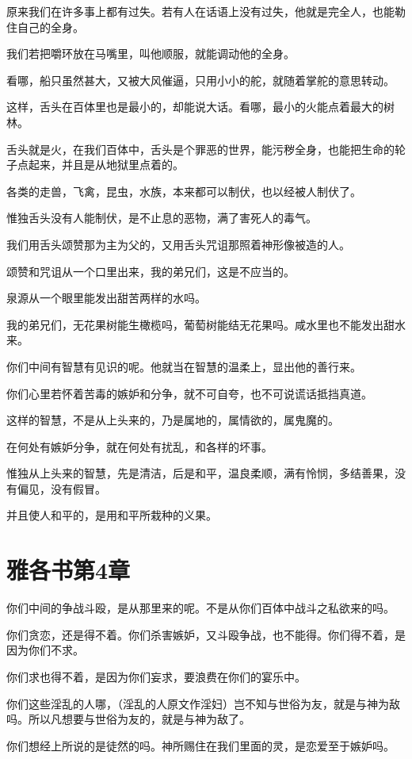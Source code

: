 \documentclass[12pt,oneside]{book}
\begin{document}
原来我们在许多事上都有过失。若有人在话语上没有过失，他就是完全人，也能勒住自己的全身。

我们若把嚼环放在马嘴里，叫他顺服，就能调动他的全身。

看哪，船只虽然甚大，又被大风催逼，只用小小的舵，就随着掌舵的意思转动。

这样，舌头在百体里也是最小的，却能说大话。看哪，最小的火能点着最大的树林。

舌头就是火，在我们百体中，舌头是个罪恶的世界，能污秽全身，也能把生命的轮子点起来，并且是从地狱里点着的。

各类的走兽，飞禽，昆虫，水族，本来都可以制伏，也以经被人制伏了。

惟独舌头没有人能制伏，是不止息的恶物，满了害死人的毒气。

我们用舌头颂赞那为主为父的，又用舌头咒诅那照着神形像被造的人。

颂赞和咒诅从一个口里出来，我的弟兄们，这是不应当的。

泉源从一个眼里能发出甜苦两样的水吗。

我的弟兄们，无花果树能生橄榄吗，葡萄树能结无花果吗。咸水里也不能发出甜水来。

你们中间有智慧有见识的呢。他就当在智慧的温柔上，显出他的善行来。

你们心里若怀着苦毒的嫉妒和分争，就不可自夸，也不可说谎话抵挡真道。

这样的智慧，不是从上头来的，乃是属地的，属情欲的，属鬼魔的。

在何处有嫉妒分争，就在何处有扰乱，和各样的坏事。

惟独从上头来的智慧，先是清洁，后是和平，温良柔顺，满有怜悯，多结善果，没有偏见，没有假冒。

并且使人和平的，是用和平所栽种的义果。

\chapter{雅各书第4章}
你们中间的争战斗殴，是从那里来的呢。不是从你们百体中战斗之私欲来的吗。

你们贪恋，还是得不着。你们杀害嫉妒，又斗殴争战，也不能得。你们得不着，是因为你们不求。

你们求也得不着，是因为你们妄求，要浪费在你们的宴乐中。

你们这些淫乱的人哪，（淫乱的人原文作淫妇）岂不知与世俗为友，就是与神为敌吗。所以凡想要与世俗为友的，就是与神为敌了。

你们想经上所说的是徒然的吗。神所赐住在我们里面的灵，是恋爱至于嫉妒吗。
\end{document}
